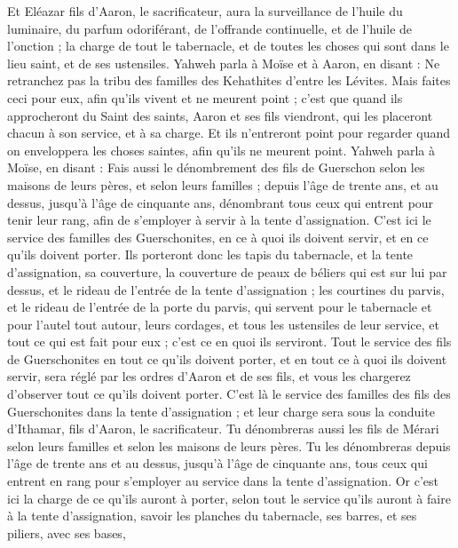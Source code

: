 \begin{multicols}{2}
Et Eléazar fils d'Aaron, le sacrificateur, aura la surveillance de l'huile du luminaire, du parfum odoriférant, de l'offrande continuelle, et de l'huile de l'onction ; la charge de tout le tabernacle, et de toutes les choses qui sont dans le lieu saint, et de ses ustensiles.
Yahweh parla à Moïse et à Aaron, en disant :
Ne retranchez pas la tribu des familles des Kehathites d'entre les Lévites.
Mais faites ceci pour eux, afin qu'ils vivent et ne meurent point ; c'est que quand ils approcheront du Saint des saints, Aaron et ses fils viendront, qui les placeront chacun à son service, et à sa charge.
Et ils n'entreront point pour regarder quand on enveloppera les choses saintes, afin qu'ils ne meurent point.
Yahweh parla à Moïse, en disant :
Fais aussi le dénombrement des fils de Guerschon selon les maisons de leurs pères, et selon leurs familles ;
depuis l'âge de trente ans, et au dessus, jusqu'à l'âge de cinquante ans, dénombrant tous ceux qui entrent pour tenir leur rang, afin de s'employer à servir à la tente d'assignation.
C'est ici le service des familles des Guerschonites, en ce à quoi ils doivent servir, et en ce qu'ils doivent porter.
Ils porteront donc les tapis du tabernacle, et la tente d'assignation, sa couverture, la couverture de peaux de béliers qui est sur lui par dessus, et le rideau de l'entrée de la tente d'assignation ;
les courtines du parvis, et le rideau de l'entrée de la porte du parvis, qui servent pour le tabernacle et pour l'autel tout autour, leurs cordages, et tous les ustensiles de leur service, et tout ce qui est fait pour eux ; c'est ce en quoi ils serviront.
Tout le service des fils de Guerschonites en tout ce qu'ils doivent porter, et en tout ce à quoi ils doivent servir, sera réglé par les ordres d'Aaron et de ses fils, et vous les chargerez d'observer tout ce qu'ils doivent porter.
C'est là le service des familles des fils des Guerschonites dans la tente d'assignation ; et leur charge sera sous la conduite d'Ithamar, fils d'Aaron, le sacrificateur.
Tu dénombreras aussi les fils de Mérari selon leurs familles et selon les maisons de leurs pères.
Tu les dénombreras depuis l'âge de trente ans et au dessus, jusqu'à l'âge de cinquante ans, tous ceux qui entrent en rang pour s'employer au service dans la tente d'assignation.
Or c'est ici la charge de ce qu'ils auront à porter, selon tout le service qu'ils auront à faire à la tente d'assignation, savoir les planches du tabernacle, ses barres, et ses piliers, avec ses bases,

\end{multicols}
